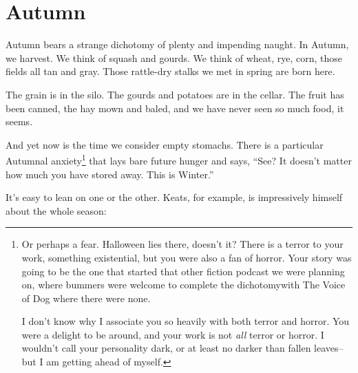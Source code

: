 \documentclass[12pt,oneside]{memoir}
\begin{document}

\section*{Autumn}

Autumn bears a strange dichotomy of plenty and impending naught. In Autumn, we harvest. We think of squash and gourds. We think of wheat, rye, corn, those fields all tan and gray. Those rattle-dry stalks we met in spring are born here.

The grain is in the silo. The gourds and potatoes are in the cellar. The fruit has been canned, the hay mown and baled, and we have never seen so much food, it seems.

And yet now is the time we consider empty stomachs. There is a particular Autumnal anxiety\footnote{Or perhaps a fear. Halloween lies there, doesn't it? There is a terror to your work, something existential, but you were also a fan of horror. Your story was going to be the one that started that other fiction podcast we were planning on, where bummers were welcome to complete the dichotomy\footnotemark with The Voice of Dog where there were none.\par
I don't know why I associate you so heavily with both terror and horror. You were a delight to be around, and your work is not \emph{all} terror or horror. I wouldn't call your personality dark, or at least no darker than fallen leaves-- but I am getting ahead of myself.}
 that lays bare future hunger and says, ``See? It doesn't matter how much you have stored away. This is Winter.''

It's easy to lean on one or the other. Keats, for example, is impressively himself about the whole season:
\end{document}
